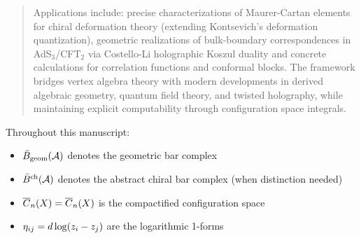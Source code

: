 \documentclass[11pt]{article}
\begin{document}
\begin{abstract}
{\medskip
\noindent
Applications include: precise characterizations of Maurer-Cartan elements for chiral deformation theory (extending Kontsevich's deformation quantization), geometric realizations of bulk-boundary correspondences in AdS$_3$/CFT$_2$ via Costello-Li holographic Koszul duality and concrete calculations for correlation functions and conformal blocks. The framework bridges vertex algebra theory with modern developments in derived algebraic geometry, quantum field theory, and twisted holography, while maintaining explicit computability through configuration space integrals.
}
\end{abstract}


\tableofcontents

\medskip
\noindent

\begin{remark}
Throughout this manuscript:
\begin{itemize}
\item $\bar{B}_{\text{geom}}(\mathcal{A})$ denotes the geometric bar complex
\item $\bar{B}^{\text{ch}}(\mathcal{A})$ denotes the abstract chiral bar complex (when distinction needed)
\item $\overline{C}_{n}(X) = \overline{C}_n(X)$ is the compactified configuration space
\item $\eta_{ij} = d\log(z_i - z_j)$ are the logarithmic 1-forms
\end{itemize}
\end{remark}
\end{document}
